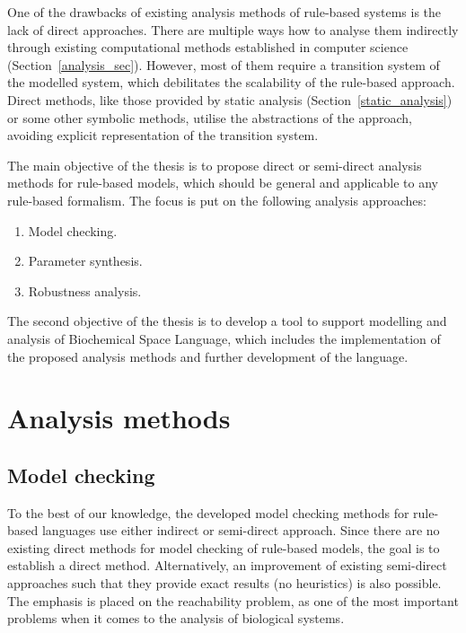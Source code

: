\documentclass[11pt,a4paper]{report}
\begin{document}
One of the drawbacks of existing analysis methods of rule-based systems is the lack of direct approaches. There are multiple ways how to analyse them indirectly through existing computational methods established in computer science (Section~\ref{analysis_sec}). However, most of them require a transition system of the modelled system, which debilitates the scalability of the rule-based approach. Direct methods, like those provided by static analysis (Section~\ref{static_analysis}) or some other symbolic methods, utilise the abstractions of the approach, avoiding explicit representation of the transition system. 

The main objective of the thesis is to propose direct or semi-direct analysis methods for rule-based models, which should be general and applicable to any rule-based formalism. The focus is put on the following analysis approaches:

\begin{enumerate}
  \setlength\itemsep{0.001cm}
  \item Model checking.
  \item Parameter synthesis.
  \item Robustness analysis.
\end{enumerate}

The second objective of the thesis is to develop a tool to support modelling and analysis of Biochemical Space Language, which includes the implementation of the proposed analysis methods and further development of the language.

\section{Analysis methods}

\subsection{Model checking}

To the best of our knowledge, the developed model checking methods for rule-based languages use either indirect or semi-direct approach. Since there are no existing direct methods for model checking of rule-based models, the goal is to establish a direct method. Alternatively, an improvement of existing semi-direct approaches such that they provide exact results (no heuristics) is also possible. The emphasis is placed on the reachability problem, as one of the most important problems when it comes to the analysis of biological systems.
\end{document}
